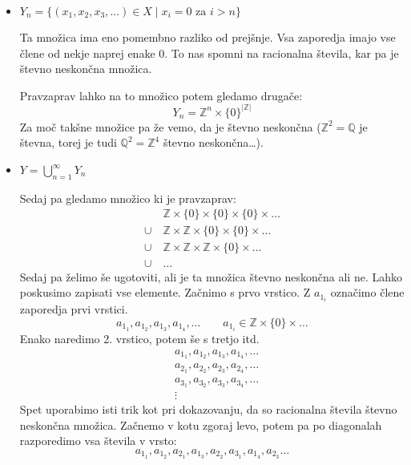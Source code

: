 \documentclass[a4paper, 12pt]{article}
\newcommand{\ZZ}{\ensuremath{\mathbb{Z}}}
\newcommand{\QQ}{\ensuremath{\mathbb{Q}}}
\begin{document}
\begin{itemize}
        \item $Y_n = \{ (x_1, x_2, x_3, \ldots ) \in X \mid x_i = 0 \text{ za } i > n \}$
        
        Ta množica ima eno pomembno razliko od prejšnje. Vsa zaporedja imajo vse člene od nekje naprej enake 0. To nas spomni na racionalna števila, kar pa je števno neskončna množica.
        
        Pravzaprav lahko na to množico potem gledamo drugače:
        \[
        Y_n = \ZZ ^ n \times \{0\} ^{|\ZZ|}
        \]
        Za moč takšne množice pa že vemo, da je števno neskončna ($\ZZ^2 = \QQ$ je števna, torej je tudi $\QQ^2 = \ZZ^4$ števno neskončna\ldots).
        \item $Y = \bigcup_{n=1}^\infty Y_n$
        
        Sedaj pa gledamo množico ki je pravzaprav: 
        \begin{align*}
        &\ZZ \times \{0\} \times \{0\} \times \{0\} \times \ldots \\
        \cup\ &\ZZ \times \ZZ \times \{0\} \times \{0\}  \times \ldots \\
        \cup\ &\ZZ \times \ZZ \times \ZZ \times \{0 \} \times \ldots \\
        \cup\ &\ldots
        \end{align*}
        Sedaj pa želimo še ugotoviti, ali je ta množica števno neskončna ali ne. Lahko poskusimo zapisati vse elemente. Začnimo s prvo vrstico. Z $a_{1_i}$ označimo člene zaporedja prvi vrstici.
        \[
        a_{1_1}, a_{1_2}, a_{1_3}, a_{1_4}, \ldots \qquad a_{1_i} \in \ZZ \times \{0 \} \times \ldots
        \]
        Enako naredimo 2. vrstico, potem še s tretjo itd.
        \begin{align*}
        &a_{1_1}, a_{1_2}, a_{1_3}, a_{1_4}, \ldots \\
        &a_{2_1}, a_{2_2}, a_{2_3}, a_{2_4}, \ldots \\
        &a_{3_1}, a_{3_2}, a_{3_3}, a_{3_4}, \ldots \\
        &\vdots
        \end{align*}
        Spet uporabimo isti trik kot pri dokazovanju, da so racionalna števila števno neskončna množica. Začnemo v kotu zgoraj levo, potem pa po diagonalah razporedimo vsa števila v vrsto:
        \[
        a_{1_1}, a_{1_2}, a_{2_1}, a_{1_3}, a_{2_2}, a_{3_1}, a_{1_4}, a_{2_3} \ldots
        \]

    \end{itemize}
   
\end{document}
